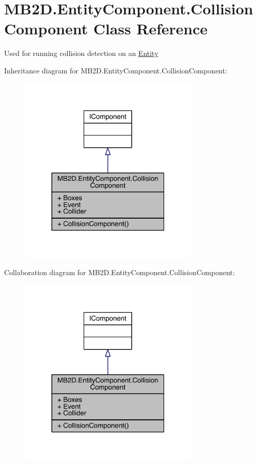 \hypertarget{class_m_b2_d_1_1_entity_component_1_1_collision_component}{}\section{M\+B2\+D.\+Entity\+Component.\+Collision\+Component Class Reference}
\label{class_m_b2_d_1_1_entity_component_1_1_collision_component}


Used for running collision detection on an \hyperlink{class_m_b2_d_1_1_entity_component_1_1_entity}{Entity}  




Inheritance diagram for M\+B2\+D.\+Entity\+Component.\+Collision\+Component\+:
\nopagebreak
\begin{figure}[H]
\begin{center}
\leavevmode
\includegraphics[width=244pt]{class_m_b2_d_1_1_entity_component_1_1_collision_component__inherit__graph}
\end{center}
\end{figure}


Collaboration diagram for M\+B2\+D.\+Entity\+Component.\+Collision\+Component\+:
\nopagebreak
\begin{figure}[H]
\begin{center}
\leavevmode
\includegraphics[width=244pt]{class_m_b2_d_1_1_entity_component_1_1_collision_component__coll__graph}
\end{center}
\end{figure}
